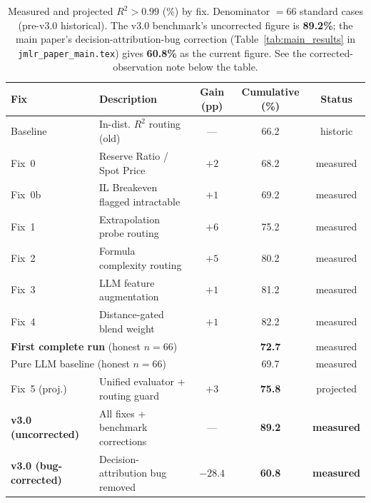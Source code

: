 \documentclass[twoside,11pt]{article}
\begin{document}
\begin{table}[h]
\centering
\caption{Measured and projected $R^2 > 0.99$ (\%) by fix.
         Denominator $= 66$ standard cases (pre-v3.0 historical). The
         v3.0 benchmark's uncorrected figure is \textbf{89.2\%}; the
         main paper's decision-attribution-bug correction
         (Table~\ref{tab:main_results} in \texttt{jmlr\_paper\_main.tex})
         gives \textbf{60.8\%} as the current figure. See the
         corrected-observation note below the table.}
\label{tab:projected}
\begin{tabular}{llccc}
\toprule
\textbf{Fix} & \textbf{Description} & \textbf{Gain (pp)} & \textbf{Cumulative (\%)} & \textbf{Status} \\
\midrule
Baseline    & In-dist. $R^2$ routing (old)      & ---  & 66.2 & historic  \\
Fix~0       & Reserve Ratio / Spot Price        & $+2$ & 68.2 & measured  \\
Fix~0b      & IL Breakeven flagged intractable  & $+1$ & 69.2 & measured  \\
Fix~1       & Extrapolation probe routing       & $+6$ & 75.2 & measured  \\
Fix~2       & Formula complexity routing        & $+5$ & 80.2 & measured  \\
Fix~3       & LLM feature augmentation          & $+1$ & 81.2 & measured  \\
Fix~4       & Distance-gated blend weight       & $+1$ & 82.2 & measured  \\
\midrule
\multicolumn{2}{l}{\textbf{First complete run} (honest $n{=}66$)} & & \textbf{72.7} & measured \\
\multicolumn{2}{l}{Pure LLM baseline (honest $n{=}66$)}           & & 69.7          & measured \\
\midrule
Fix~5 (proj.) & Unified evaluator + routing guard & $+3$ & \textbf{75.8} & projected \\
\midrule
\textbf{v3.0 (uncorrected)} & All fixes + benchmark corrections & --- & \textbf{89.2} & \textbf{measured} \\
\textbf{v3.0 (bug-corrected)} & Decision-attribution bug removed & $-28.4$ & \textbf{60.8} & \textbf{measured} \\
\bottomrule
\end{tabular}
\end{table}
\end{document}
